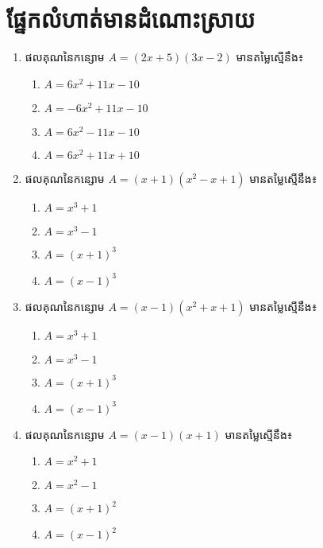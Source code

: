 \section{ផ្នែកលំហាត់មានដំណោះស្រាយ}
\begin{enumerate}
\item ផលគុណនៃកន្សោម $A=(2x+5)(3x-2)$ មានតម្លៃស្មើនឹង៖
\begin{multicols}{2}
\begin{enumerate}[label=\alph*.]
\item $A=6x^2+11x-10$
\item $A=-6x^2+11x-10$
\item $A=6x^2-11x-10$
\item $A=6x^2+11x+10$
\end{enumerate}
\end{multicols}
\item ផលគុណនៃកន្សោម $A=(x+1)(x^2-x+1)$ មានតម្លៃស្មើនឹង៖
\begin{multicols}{4}
\begin{enumerate}[label=\alph*.]
\item $A=x^3+1$
\item $A=x^3-1$
\item $A=(x+1)^3$
\item $A=(x-1)^3$
\end{enumerate}
\end{multicols}
\item ផលគុណនៃកន្សោម $A=(x-1)(x^2+x+1)$ មានតម្លៃស្មើនឹង៖
\begin{multicols}{4}
\begin{enumerate}[label=\alph*.]
\item $A=x^3+1$
\item $A=x^3-1$
\item $A=(x+1)^3$
\item $A=(x-1)^3$
\end{enumerate}
\end{multicols}
\item ផលគុណនៃកន្សោម $A=(x-1)(x+1)$ មានតម្លៃស្មើនឹង៖
\begin{multicols}{4}
\begin{enumerate}[label=\alph*.]
\item $A=x^2+1$
\item $A=x^2-1$
\item $A=(x+1)^2$
\item $A=(x-1)^2$
\end{enumerate}
\end{multicols}


\end{enumerate}
